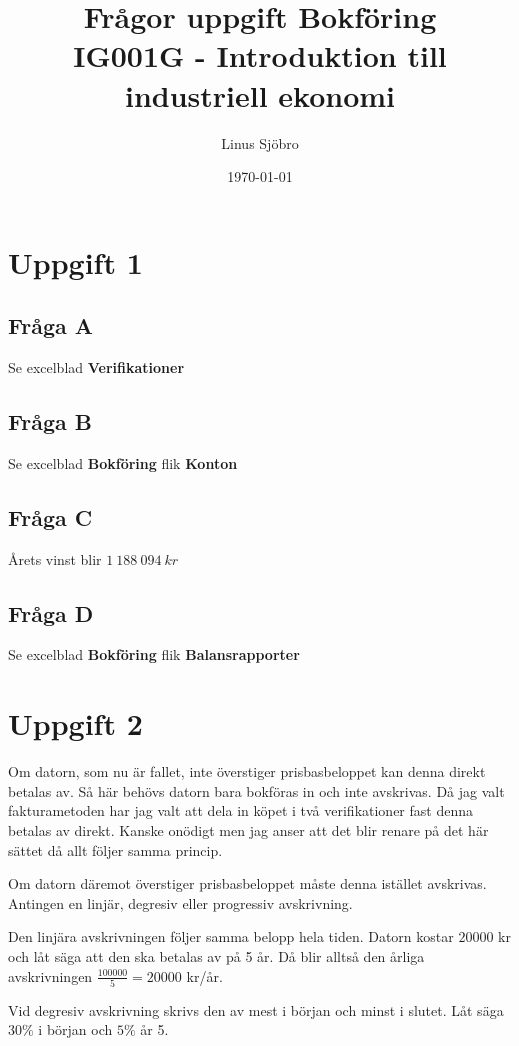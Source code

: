 \documentclass[12pt]{article}
\title{Frågor uppgift Bokföring \\ \large{IG001G - Introduktion till industriell ekonomi}}
\author{Linus Sjöbro}
\date{\today}
\begin{document}
\maketitle

\section*{Uppgift 1}
\subsection*{Fråga A}
Se excelblad \textbf{Verifikationer}

\subsection*{Fråga B}
Se excelblad \textbf{Bokföring} flik \textbf{Konton}

\subsection*{Fråga C}
Årets vinst blir $1 \: 188 \: 094 \: kr$

\subsection*{Fråga D}
Se excelblad \textbf{Bokföring} flik \textbf{Balansrapporter}

\section*{Uppgift 2}
Om datorn, som nu är fallet, inte överstiger prisbasbeloppet kan denna direkt betalas av. Så här behövs datorn bara bokföras in och inte avskrivas. Då jag valt fakturametoden har jag valt att dela in köpet i två verifikationer fast denna betalas av direkt. Kanske onödigt men jag anser att det blir renare på det här sättet då allt följer samma princip.

\bigskip

Om datorn däremot överstiger prisbasbeloppet måste denna istället avskrivas.
Antingen en linjär, degresiv eller progressiv avskrivning.

Den linjära avskrivningen följer samma belopp hela tiden. Datorn kostar $20000$ kr och låt säga att den ska betalas av på 5 år. Då blir alltså den årliga avskrivningen $\frac{100000}{5}=20000$ kr/år.

Vid degresiv avskrivning skrivs den av mest i början och minst i slutet. Låt säga $30 \%$ i början och $5 \%$ år 5.
\end{document}
